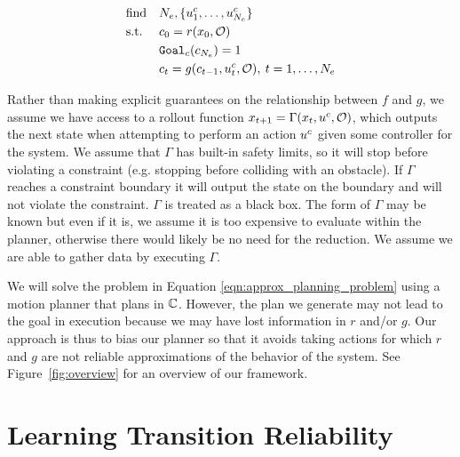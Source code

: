 \begin{equation}
    \begin{aligned}
        & \text{find}   & & N_e, \{u^c_1, \dots, u^c_{N_e} \} \\
        & \text{s.t.}   & & c_0 = r(x_0,\mathcal{O}) \\
        &               & &  \texttt{Goal}_c(c_{N_e}) = 1\\
        &               & & c_{t} = g(c_{t-1},u^c_t,\mathcal{O}), \:  t = 1, \dots, N_e \\
    \end{aligned}
    \label{eqn:approx_planning_problem}
\end{equation}

Rather than making explicit guarantees on the relationship between $f$ and $g$, we assume we have access to a rollout function $x_{t+1} = \Gamma(x_t,u^c,\mathcal{O})$, which outputs the next state when attempting to perform an action $u^c$ given some controller for the system. We assume that $\Gamma$ has built-in safety limits, so it will stop before violating a constraint (e.g. stopping before colliding with an obstacle). If $\Gamma$ reaches a constraint boundary it will output the state on the boundary and will not violate the constraint. $\Gamma$ is treated as a black box. The form of $\Gamma$ may be known but even if it is, we assume it is too expensive to evaluate within the planner, otherwise there would likely be no need for the reduction. We assume we are able to gather data by executing $\Gamma$.%

We will solve the problem in Equation \ref{eqn:approx_planning_problem} using a motion planner that plans in $\mathbb{C}$. However, the plan we generate may not lead to the goal in execution because we may have lost information in $r$ and/or $g$. Our approach is thus to bias our planner so that it avoids taking actions for which $r$ and $g$ are not reliable approximations of the behavior of the system. See Figure~\ref{fig:overview} for an overview of our framework.





\section{Learning Transition Reliability}


